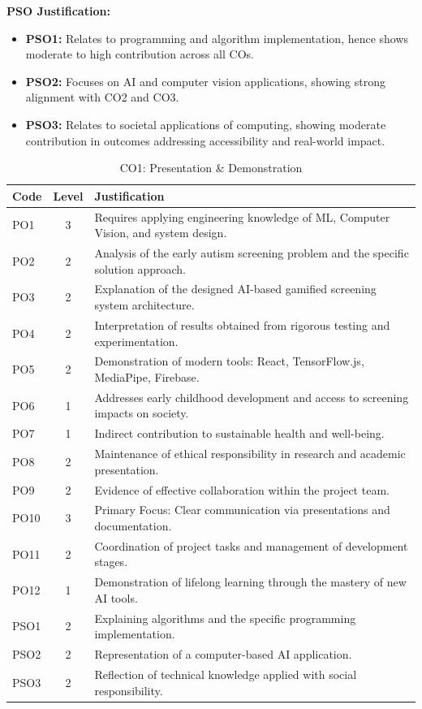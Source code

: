 \documentclass[12pt,a4paper]{report}
\begin{document}
\noindent \textbf{PSO Justification:}

\begin{itemize}
    \item \textbf{PSO1:} Relates to programming and algorithm implementation, hence shows moderate to high contribution across all COs.
    \item \textbf{PSO2:} Focuses on AI and computer vision applications, showing strong alignment with CO2 and CO3.
    \item \textbf{PSO3:} Relates to societal applications of computing, showing moderate contribution in outcomes addressing accessibility and real-world impact.
\end{itemize}
\begin{table}[h!]
    \centering
    \caption{CO1: Presentation \& Demonstration}
    \renewcommand{\arraystretch}{1.3}
    \begin{tabularx}{\textwidth}{@{}l c X@{}}
        \toprule
        \textbf{Code} & \textbf{Level} & \textbf{Justification} \\
        \midrule
        PO1 & 3 & Requires applying engineering knowledge of ML, Computer Vision, and system design. \\
        PO2 & 2 & Analysis of the early autism screening problem and the specific solution approach. \\
        PO3 & 2 & Explanation of the designed AI-based gamified screening system architecture. \\
        PO4 & 2 & Interpretation of results obtained from rigorous testing and experimentation. \\
        PO5 & 2 & Demonstration of modern tools: React, TensorFlow.js, MediaPipe, Firebase. \\
        PO6 & 1 & Addresses early childhood development and access to screening impacts on society. \\
        PO7 & 1 & Indirect contribution to sustainable health and well-being. \\
        PO8 & 2 & Maintenance of ethical responsibility in research and academic presentation. \\
        PO9 & 2 & Evidence of effective collaboration within the project team. \\
        PO10 & 3 & Primary Focus: Clear communication via presentations and documentation. \\
        PO11 & 2 & Coordination of project tasks and management of development stages. \\
        PO12 & 1 & Demonstration of lifelong learning through the mastery of new AI tools. \\
        PSO1 & 2 & Explaining algorithms and the specific programming implementation. \\
        PSO2 & 2 & Representation of a computer-based AI application. \\
        PSO3 & 2 & Reflection of technical knowledge applied with social responsibility. \\
        \bottomrule
    \end{tabularx}
\end{table}
\end{document}
